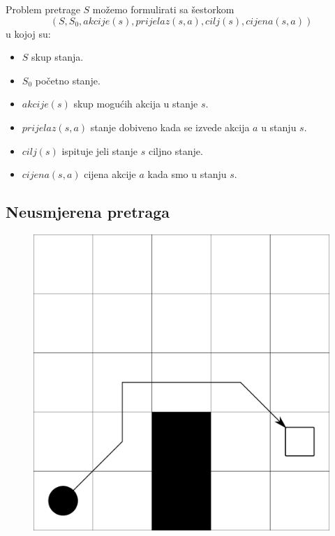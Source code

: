 \documentclass[times, utf8, zavrsni, numeric]{fer}
\begin{document}
\par Problem pretrage \(S\) možemo formulirati sa šestorkom
\[(S, S_0, akcije(s), prijelaz(s, a), cilj(s), cijena(s, a))\]
u kojoj su:
\begin{itemize}
    \item \(S\) skup stanja.
    \item \(S_0\) početno stanje.
    \item \(akcije(s)\) skup mogućih akcija u stanje \(s\).
    \item \(prijelaz(s, a)\) stanje dobiveno kada se izvede akcija \(a\) u stanju \(s\).
    \item \(cilj(s)\) ispituje jeli stanje \(s\) ciljno stanje.
    \item \(cijena(s, a)\) cijena akcije \(a\) kada smo u stanju \(s\). 
\end{itemize}

\subsection{Neusmjerena pretraga}

\begin{figure}[h] 
	\centering
	\includegraphics[width=0.3\linewidth]{images/basicGrid.pdf}
	\caption{}
	\label{fig:basicGrid}
\end{figure} 
\end{document}
